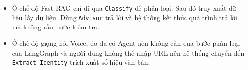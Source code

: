 \begin{itemize}
\item Ở chế độ Fast RAG
chỉ đi qua \texttt{Classify} để phân loại.
Sau đó truy xuất dữ liệu lấy dữ liệu.
Dùng \texttt{Advisor} trả lời
và
hệ thống kết thúc quá trình trả lời
mà không cần bước kiểm tra.

\item Ở chế độ giọng nói Voice,
do đã có Agent nên không cần qua bước phân loại của LangGraph
và người dùng không thể nhập URL nên hệ thống chuyển đến \texttt{Extract Identity} trích xuất số hiệu văn bản.

\end{itemize}
